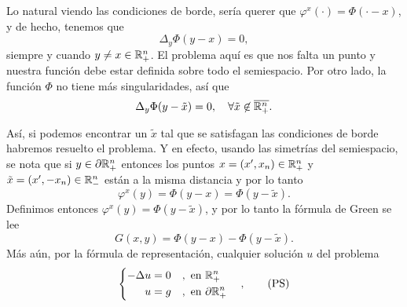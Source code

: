 \documentclass[../edp.tex]{subfiles}
\begin{document}
Lo natural viendo las condiciones de borde, sería querer que
\(\varphi^{x}(\cdot) = \Phi(\cdot - x)\), y de hecho, tenemos que 
\begin{displaymath}
	\Delta_{y} \Phi(y-x) = 0,
\end{displaymath}
siempre y cuando \(y\ne x \in \mathbb{R}^{n}_{+}\). El problema aquí es que nos falta un
punto y nuestra función debe estar definida sobre todo el semiespacio. Por otro
lado, la función \(\Phi\) no tiene más singularidades, así que
\begin{displaymath}
	\Delta_{y} \Phi(y - \tilde{x}) = 0
	,\quad \forall \tilde{x}\not\in\overline{\mathbb{R}^{n}_{+}}.
\end{displaymath}
\begin{wrapfigure}{r}{0.3\textwidth}
\hspace{2em}
\end{wrapfigure}
Así, si podemos encontrar un \(\tilde x\) tal que se satisfagan las
condiciones de borde habremos resuelto el problema. Y en efecto, usando las
simetrías del semiespacio, se nota que si \(y\in\partial\mathbb{R}^{n}_{+}\) entonces
los puntos \(x = (x', x_n) \in \mathbb{R}^{n}_{+}\) y \(\tilde x = (x', -x_n)
\in\mathbb{R}^{n}_{-}\) están a la misma distancia y por lo tanto
\begin{displaymath}
	\varphi^{x}(y)
	=
	\Phi(y - x) 
	= 
	\Phi(y - \tilde{x}).
\end{displaymath}
Definimos entonces \(\varphi^{x}(y) = \Phi(y - \tilde{x})\), y por lo tanto la
fórmula de Green se lee
\begin{displaymath}\label{Green:semiplano}
	G(x,y) = \Phi(y-x) - \Phi(y-\tilde{x}).
	\tag{GS}
\end{displaymath}
Más aún, por la fórmula de representación, cualquier solución \(u\) del problema
\begin{displaymath}\label{poisson:semiespacio}
\begin{cases}
\begin{aligned}
	-\Delta u &= 0 &&, \text{ en } \mathbb{R}^n_{+}\\
	u &= g &&, \text{ en } \partial\mathbb{R}^{n}_{+}
\end{aligned}
\end{cases},
\tag{PS}
\end{displaymath}
\end{document}
